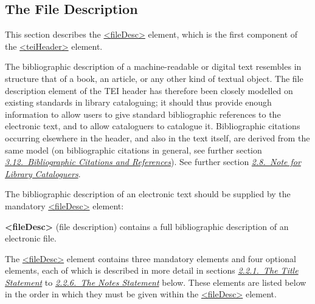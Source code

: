 \subsection[{The File Description}]{The File Description}\label{HD2}\par
This section describes the \hyperref[TEI.fileDesc]{<fileDesc>} element, which is the first component of the \hyperref[TEI.teiHeader]{<teiHeader>} element.\par
The bibliographic description of a machine-readable or digital text resembles in structure that of a book, an article, or any other kind of textual object. The file description element of the TEI header has therefore been closely modelled on existing standards in library cataloguing; it should thus provide enough information to allow users to give standard bibliographic references to the electronic text, and to allow cataloguers to catalogue it. Bibliographic citations occurring elsewhere in the header, and also in the text itself, are derived from the same model (on bibliographic citations in general, see further section \textit{\hyperref[COBI]{3.12.\ Bibliographic Citations and References}}). See further section \textit{\hyperref[HD8]{2.8.\ Note for Library Cataloguers}}.\par
The bibliographic description of an electronic text should be supplied by the mandatory \hyperref[TEI.fileDesc]{<fileDesc>} element: 
\begin{sansreflist}
  
\item [\textbf{<fileDesc>}] (file description) contains a full bibliographic description of an electronic file.
\end{sansreflist}
\par
The \hyperref[TEI.fileDesc]{<fileDesc>} element contains three mandatory elements and four optional elements, each of which is described in more detail in sections \textit{\hyperref[HD21]{2.2.1.\ The Title Statement}} to \textit{\hyperref[HD27]{2.2.6.\ The Notes Statement}} below. These elements are listed below in the order in which they must be given within the \hyperref[TEI.fileDesc]{<fileDesc>} element. 
